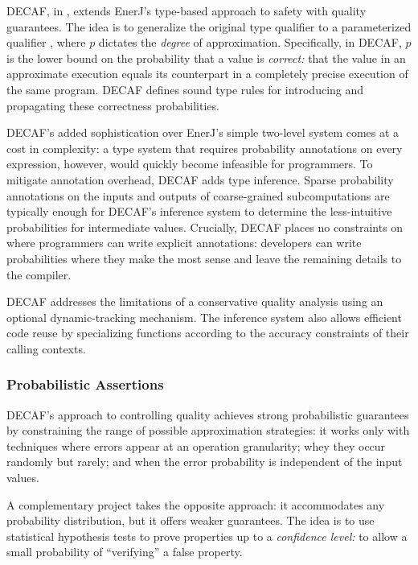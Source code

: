DECAF, in , extends EnerJ's type-based approach to safety with
quality guarantees.
The idea is to generalize the original  type qualifier to a
parameterized qualifier , where $p$ dictates the
\emph{degree} of approximation.
Specifically, in DECAF, $p$ is the lower bound on the probability that a value
is \emph{correct:} that the value in an approximate execution equals its
counterpart in a completely precise execution of the same program.
DECAF defines sound type rules for introducing and propagating these
correctness probabilities.

DECAF's added sophistication over EnerJ's simple two-level system comes at a
cost in complexity:
a type system that requires probability annotations on every expression,
however, would quickly become infeasible for programmers.
To mitigate annotation overhead, DECAF adds type inference.
Sparse probability annotations on the inputs and outputs of coarse-grained
subcomputations are typically enough for DECAF's inference system to determine
the less-intuitive probabilities for intermediate values.
Crucially, DECAF places no constraints on where programmers can write explicit
annotations:
developers can write probabilities where they make the most sense and leave
the remaining details to the compiler.

DECAF addresses the limitations of a conservative quality analysis using
an optional dynamic-tracking mechanism.
The inference system also allows efficient code reuse by specializing
functions according to the accuracy constraints of their calling contexts.

\subsubsection{Probabilistic Assertions}

DECAF's approach to controlling quality achieves strong probabilistic
guarantees by constraining the range of possible approximation strategies:
it works only with techniques where errors appear at an operation granularity;
whey they occur randomly but rarely; and when the error probability is
independent of the input values.

A complementary project takes the opposite approach:
it accommodates any probability distribution, but it offers weaker
guarantees.
The idea is to use statistical hypothesis tests to prove properties up to a
\emph{confidence level:}
to allow a small probability of ``verifying'' a false property.


